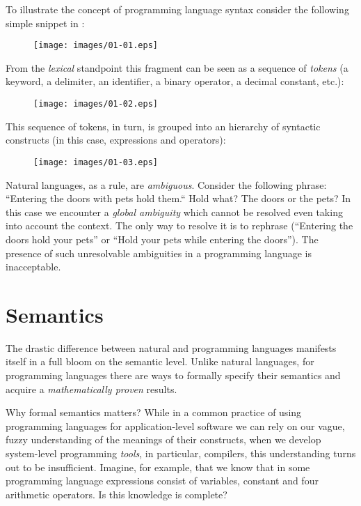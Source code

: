 To illustrate the concept of programming language syntax consider the following simple snippet in :

\begin{figure}[h]
  \centering
  \texttt{[image: images/01-01.eps]}
\end{figure}

From the \emph{lexical} standpoint this fragment can be seen as a sequence of \emph{tokens} (a keyword, a delimiter, an identifier, a binary operator,
a decimal constant, etc.):

\begin{figure}[h]
  \centering
  \texttt{[image: images/01-02.eps]}
\end{figure}

This sequence of tokens, in turn, is grouped into an hierarchy of syntactic constructs (in this case, expressions and operators):

\begin{figure}[h]
  \centering
  \texttt{[image: images/01-03.eps]}
\end{figure}

Natural languages, as a rule, are \emph{ambiguous}. Consider the following phrase: ``Entering the doors with pets hold them.`` Hold what? The doors or the pets?
In this case we encounter a \emph{global ambiguity} which cannot be resolved even taking into account the context. The only way to resolve it is to
rephrase (``Entering the doors hold your pets'' or ``Hold your pets while entering the doors''). The presence of such unresolvable ambiguities in a
programming language is inacceptable.

\section{Semantics}

The drastic difference between natural and programming languages manifests itself in a full bloom on the semantic level. Unlike natural languages,
for programming languages there are ways to formally specify their semantics and acquire a \emph{mathematically proven} results.

Why formal semantics matters? While in a common practice of using programming languages for application-level software we can rely on our vague, fuzzy
understanding of the meanings of their constructs, when we develop system-level programming \emph{tools}, in particular, compilers, this understanding
turns out to be insufficient. Imagine, for example, that we know that in some programming language expressions consist of variables, constant and four
arithmetic operators. Is this knowledge is complete?

